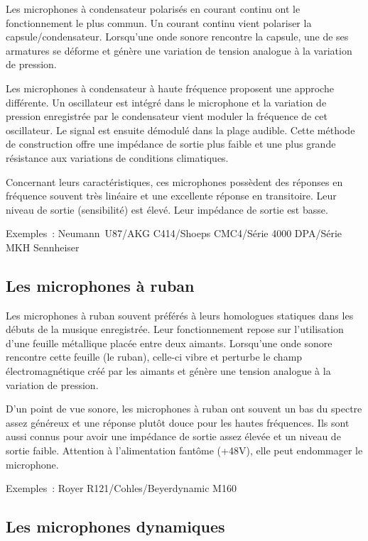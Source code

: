 \documentclass[
]{book}
\begin{document}
Les microphones à condensateur polarisés en courant continu ont le fonctionnement le plus commun. Un courant continu vient polariser la capsule/condensateur. Lorsqu'une onde sonore rencontre la capsule, une de ses armatures se déforme et génère une variation de tension analogue à la variation de pression.

Les microphones à condensateur à haute fréquence proposent une approche différente. Un oscillateur est intégré dans le microphone et la variation de pression enregistrée par le condensateur vient moduler la fréquence de cet oscillateur. Le signal est ensuite démodulé dans la plage audible. Cette méthode de construction offre une impédance de sortie plus faible et une plus grande résistance aux variations de conditions climatiques.

Concernant leurs caractéristiques, ces microphones possèdent des réponses en fréquence souvent très linéaire et une excellente réponse en transitoire. Leur niveau de sortie (sensibilité) est élevé. Leur impédance de sortie est basse.

Exemples~: Neumann~U87/AKG C414/Shoeps CMC4/Série 4000 DPA/Série MKH Sennheiser

\hypertarget{les-microphones-uxe0-ruban}{%
\subsection{Les microphones à ruban}\label{les-microphones-uxe0-ruban}}

Les microphones à ruban souvent préférés à leurs homologues statiques dans les débuts de la musique enregistrée. Leur fonctionnement repose sur l'utilisation d'une feuille métallique placée entre deux aimants. Lorsqu'une onde sonore rencontre cette feuille (le ruban), celle-ci vibre et perturbe le champ électromagnétique créé par les aimants et génère une tension analogue à la variation de pression.

D'un point de vue sonore, les microphones à ruban ont souvent un bas du spectre assez généreux et une réponse plutôt douce pour les hautes fréquences. Ils sont aussi connus pour avoir une impédance de sortie assez élevée et un niveau de sortie faible. Attention à l'alimentation fantôme (+48V), elle peut endommager le microphone.

Exemples~: Royer R121/Cohles/Beyerdynamic M160

\hypertarget{les-microphones-dynamiques}{%
\subsection{Les microphones dynamiques}\label{les-microphones-dynamiques}}
\end{document}
